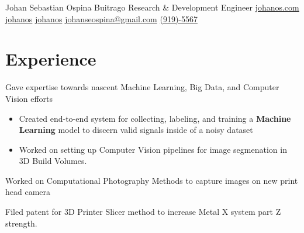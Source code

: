 \documentclass[]{plushcv}
\begin{document}
%
%
    
\namesection
{Johan Sebastian }
{Ospina Buitrago}
{Research \& Development Engineer}
{
    \contactline
    {\href{https://www.johanos.com}{johanos.com}}
    {\href{https://www.github.com/johanos}{johanos}}
    {\href{https://www.linkedin.com/in/johanos}
        {johanos}}
    {\href{mailto:johanseospina@gmail.com}{johanseospina@gmail.com}}
    {\href{tel:+1 (919) 946-5567}{(919)-5567}}
}

%
%

\begin{minipage}[t]{0.70\textwidth}



    \section{Experience}
    \vspace{\topsep} %
    \begin{tightemize}
        \sectionsep
        \item Gave expertise towards nascent Machine Learning, Big Data, and Computer Vision efforts
        \begin{itemize}
            \item Created end-to-end system for collecting, labeling, and training
                  a \textbf{Machine Learning} model to discern valid signals inside of a noisy dataset
            \item Worked on setting up Computer Vision pipelines for image segmenation in 3D Build Volumes.
        \end{itemize}
        \item Worked on Computational Photography Methods to capture images on new print head camera
        \item Filed patent for 3D Printer Slicer method to increase Metal X system part Z strength.
    \end{tightemize}
    \sectionsep


\end{minipage}
\end{document}
